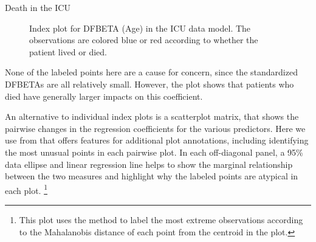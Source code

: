 \documentclass[11pt]{book}
\renewenvironment{knitrout}{\small\renewcommand{\baselinestretch}{.85}}{} %
\begin{document}
\begin{Example}[icu2]{Death in the ICU}
\begin{knitrout}
\begin{figure}[!htbp]
\caption[Index plot for DFBETA (Age) in the ICU data model]{Index plot for DFBETA (Age) in the ICU data model. The observations are colored blue or red according to whether the patient lived or died.\label{fig:icu2-dbage}}
\end{figure}


\end{knitrout}
None of the labeled points here are a cause for concern, since the standardized DFBETAs
are all relatively small.  However, the plot shows that patients who died have generally
larger impacts on this coefficient.

An alternative to individual index plots is a scatterplot matrix, that shows the pairwise
changes in the regression coefficients for the various predictors.  Here we use
 from  that offers features for additional plot
annotations, including identifying the most unusual points in each pairwise plot.
In each off-diagonal panel, a 95\% data ellipse and linear regression line helps to
show the marginal relationship between the two measures and highlight why the
labeled points are atypical in each plot.%
\footnote{
This plot uses the  method
to label the most extreme observations
according to the Mahalanobis distance of each point from the centroid in the plot.
}

\begin{knitrout}
\color{fgcolor}\begin{kframe}
\begin{alltt}
 \hlstd{=}\hlstd{,} \hlstd{=}\hlstd{,}
  \hlstd{=}\hlstd{,} \hlstd{=}\hlstd{,} \hlstd{=}\hlstd{,}
  \hlstd{=}\hlstd{,}
  \hlopt{$} \hlstd{=}\hlstd{(}\hlstd{,} \hlstd{))}
\end{alltt}
\end{kframe}\begin{figure}[!htbp]



\end{figure}
\end{knitrout}
\end{Example}
\end{document}
